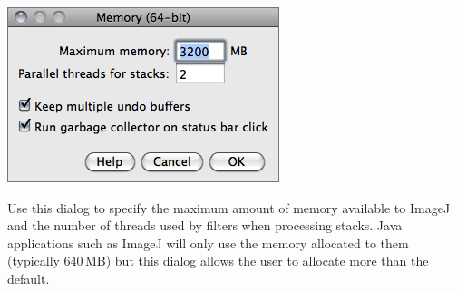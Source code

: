 \begin{minipage}[c][1\totalheight][t]{0.42\columnwidth}%
\includegraphics[scale=0.55]{images/MemoryAndThreads}%
\end{minipage}%
\begin{minipage}[c][1\totalheight][t]{0.58\columnwidth}%
Use this dialog to specify the maximum amount of memory
available to ImageJ and the number of threads used by filters when
processing stacks.\vspace*{\medskipamount}
 Java applications such as ImageJ will only use the memory
allocated to them (typically 640\,MB) but this dialog allows the
user to allocate more than the default.%
\end{minipage}\vspace*{\medskipamount}


